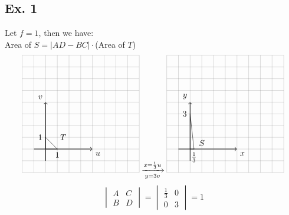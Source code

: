\documentclass[12pt]{article}
\begin{document}
\subsection*{Ex. 1}
    Let $f=1$, then we have: \\
    Area of $S=|AD-BC|\cdot$(Area of $T$) \\
    \[
        \begin{tikzpicture}[scale=0.5]
            \draw[thick,->] (-1,0) -- (4,0) node[anchor=north west] {$u$};
            \draw[thick,->] (0,-1) -- (0,4) node[anchor=south east] {$v$};
            \draw[step=1cm,gray,very thin] (-2,-2) grid (8,8);
            \draw (0, 0) -- (0,1) -- (1,0) -- cycle;
            \draw (1.5,1.5) node[anchor=north]{$T$};
            \draw (1pt,1 cm) -- (-1pt,1 cm) node[anchor=east] {$1$};
            \draw (1 cm,1pt) -- (1 cm,-1pt) node[anchor=north] {$1$};
        \end{tikzpicture}
        \xrightarrow[y=3v]{x=\frac{1}{3}u}
        \begin{tikzpicture}[scale=0.5]
            \draw[thick,->] (-1,0) -- (4,0) node[anchor=north west] {$x$};
            \draw[thick,->] (0,-1) -- (0,4) node[anchor=south east] {$y$};
            \draw[step=1cm,gray,very thin] (-2,-2) grid (8,8);
            \draw (0, 0) -- (.33,0) -- (0,3) -- cycle;
            \draw (1,1) node[anchor=north]{$S$};
            \draw (1pt,3 cm) -- (-1pt,3 cm) node[anchor=east] {$3$};
            \draw (.33 cm,1pt) -- (.33 cm,-1pt) node[anchor=north] {$\frac{1}{3}$};
        \end{tikzpicture}
    \]
    \[
        \begin{vmatrix*}
            A & C \\
            B & D
        \end{vmatrix*}     
        =
        \begin{vmatrix*}
            \frac{1}{3} & 0 \\
            0 & 3
        \end{vmatrix*}
        = 1
    \]
\end{document}
